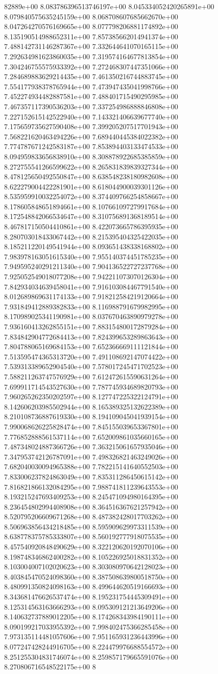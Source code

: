 82889e+00	8.083786396513746197e+00	8.045334052420265891e+00	8.079840575635245159e+00	8.068708607685662670e+00	8.047264270576169665e+00	8.077798206881174892e+00	8.135190514988652311e+00	7.857385662014941374e+00	7.488142731146287367e+00	7.332644641070165115e+00	7.292634981623860035e+00	7.319574164677813854e+00	7.304246755575933392e+00	7.272468307447351066e+00	7.284689883629214435e+00	7.461350216744883745e+00	7.554177938378765944e+00	7.473947435041998766e+00	7.452274934482887581e+00	7.488401715490295985e+00	7.467357117390536203e+00	7.337254986888846808e+00	7.227152615142522940e+00	7.143321406639677740e+00	7.175659735627590408e+00	7.399205207517701943e+00	7.568221620463494226e+00	7.689440445384022382e+00	7.774787671242583187e+00	7.853894403133474533e+00	8.094959833656838910e+00	8.308878922685385859e+00	8.272755541266599622e+00	8.265831839839327344e+00	8.478125650492550847e+00	8.638548238180982608e+00	8.622279004422281901e+00	8.618044900039301126e+00	8.535959910032254072e+00	8.374409766254858667e+00	8.178605848651894661e+00	8.107661097279917684e+00	8.172548842066534647e+00	8.310756891368189514e+00	8.467817150504410861e+00	8.422073665786395935e+00	8.280703018433067442e+00	8.215395404325422035e+00	8.185211220149541944e+00	8.093651438338168802e+00	7.983978163051615340e+00	7.955140374451785235e+00	7.949595240291211340e+00	7.904136522727237768e+00	7.925052549018077208e+00	7.942211073070126304e+00	7.842934034639458041e+00	7.916103084467791540e+00	8.012689869631174133e+00	7.918212584219120664e+00	7.931849412889382833e+00	8.116988791679982995e+00	8.170989025341190981e+00	8.037670463890979278e+00	7.936160413262855151e+00	7.883154800172879284e+00	7.834842904772684413e+00	7.824399653289863643e+00	7.804788065169684153e+00	7.652366669111121844e+00	7.513595474365313720e+00	7.491108692147074422e+00	7.539313389652904540e+00	7.578017245471702523e+00	7.588211263747576929e+00	7.612472615590631264e+00	7.699911714543527630e+00	7.787745934689820793e+00	7.960265262350202597e+00	8.127747225322124791e+00	8.142606203985502944e+00	8.165389325132622389e+00	8.210108736887619330e+00	8.194109045041939154e+00	7.990068626225828474e+00	7.845155039653367801e+00	7.776852888561537114e+00	7.652009861035660165e+00	7.487348024887366726e+00	7.363215061657935046e+00	7.347953742126787091e+00	7.498326821463249026e+00	7.682040030094965388e+00	7.782215141640552503e+00	7.833006237824863049e+00	7.835311286450615142e+00	7.816821866132084295e+00	7.988741811239643553e+00	8.193215247693409253e+00	8.245471094980164395e+00	8.236454802994408908e+00	8.364516367621257942e+00	8.520795206609671268e+00	8.487382428017703262e+00	8.506963856434218485e+00	8.595909629973311539e+00	8.638778375785333807e+00	8.560192777918075535e+00	8.457540920848490629e+00	8.322120620192070106e+00	8.198748346862400282e+00	8.105226925018831352e+00	8.103004007102020623e+00	8.303080970642128023e+00	8.403845470524098360e+00	8.387508639800518750e+00	8.480991350824098163e+00	8.499644620519166693e+00	8.343681476626537474e+00	8.195231754445309491e+00	8.125314563163666293e+00	8.095309121213649206e+00	8.140632737889012205e+00	8.174268343984190111e+00	8.090199217033955392e+00	7.998402475366285458e+00	7.973135114481057606e+00	7.951165931236443996e+00	8.077247428244916705e+00	8.224479976688554572e+00	8.251255304831746074e+00	8.259857179665591076e+00	8.270806716548522175e+00	8